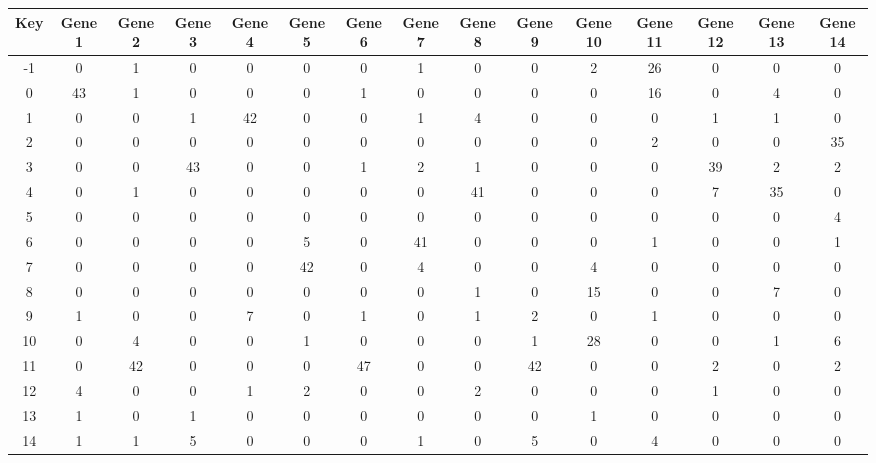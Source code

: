 \begin{tabular}{|c|c|c|c|c|c|c|c|c|c|c|c|c|c|c|}
\hline
Key & Gene 1 & Gene 2 & Gene 3 & Gene 4 & Gene 5 & Gene 6 & Gene 7 & Gene 8 & Gene 9 & Gene 10 & Gene 11 & Gene 12 & Gene 13 & Gene 14 \\
\hline
-1 & 0 & 1 & 0 & 0 & 0 & 0 & 1 & 0 & 0 & 2 & 26 & 0 & 0 & 0 \\
0 & 43 & 1 & 0 & 0 & 0 & 1 & 0 & 0 & 0 & 0 & 16 & 0 & 4 & 0 \\
1 & 0 & 0 & 1 & 42 & 0 & 0 & 1 & 4 & 0 & 0 & 0 & 1 & 1 & 0 \\
2 & 0 & 0 & 0 & 0 & 0 & 0 & 0 & 0 & 0 & 0 & 2 & 0 & 0 & 35 \\
3 & 0 & 0 & 43 & 0 & 0 & 1 & 2 & 1 & 0 & 0 & 0 & 39 & 2 & 2 \\
4 & 0 & 1 & 0 & 0 & 0 & 0 & 0 & 41 & 0 & 0 & 0 & 7 & 35 & 0 \\
5 & 0 & 0 & 0 & 0 & 0 & 0 & 0 & 0 & 0 & 0 & 0 & 0 & 0 & 4 \\
6 & 0 & 0 & 0 & 0 & 5 & 0 & 41 & 0 & 0 & 0 & 1 & 0 & 0 & 1 \\
7 & 0 & 0 & 0 & 0 & 42 & 0 & 4 & 0 & 0 & 4 & 0 & 0 & 0 & 0 \\
8 & 0 & 0 & 0 & 0 & 0 & 0 & 0 & 1 & 0 & 15 & 0 & 0 & 7 & 0 \\
9 & 1 & 0 & 0 & 7 & 0 & 1 & 0 & 1 & 2 & 0 & 1 & 0 & 0 & 0 \\
10 & 0 & 4 & 0 & 0 & 1 & 0 & 0 & 0 & 1 & 28 & 0 & 0 & 1 & 6 \\
11 & 0 & 42 & 0 & 0 & 0 & 47 & 0 & 0 & 42 & 0 & 0 & 2 & 0 & 2 \\
12 & 4 & 0 & 0 & 1 & 2 & 0 & 0 & 2 & 0 & 0 & 0 & 1 & 0 & 0 \\
13 & 1 & 0 & 1 & 0 & 0 & 0 & 0 & 0 & 0 & 1 & 0 & 0 & 0 & 0 \\
14 & 1 & 1 & 5 & 0 & 0 & 0 & 1 & 0 & 5 & 0 & 4 & 0 & 0 & 0 \\
\hline
\end{tabular}